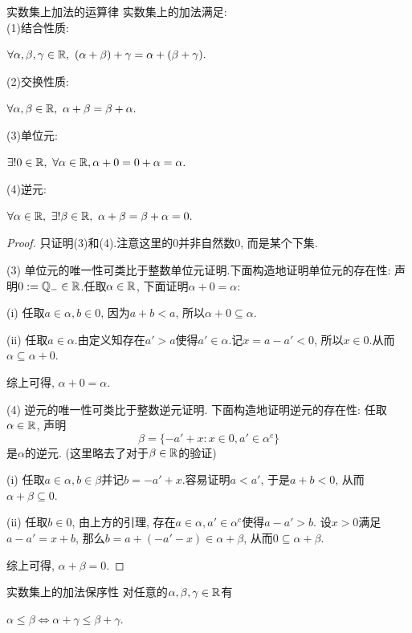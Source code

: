 \begin{proposition}{实数集上加法的运算律}
	实数集上的加法满足:  \\
	(1)结合性质: 
	\begin{center}
		$\forall \alpha , \beta , \gamma \in \mathbb{R} , ~(\alpha + \beta ) + \gamma = \alpha + (\beta + \gamma).$
	\end{center}
	(2)交换性质: 
	\begin{center}
		$\forall \alpha , \beta \in \mathbb{R}, ~\alpha + \beta = \beta + \alpha .$
	\end{center}
	(3)单位元: 
	\begin{center}
		$\exists ! 0 \in \mathbb{R} , ~\forall \alpha \in \mathbb{R} ,  \alpha + 0 = 0 + \alpha = \alpha .$
	\end{center}
	(4)逆元: 
	\begin{center}
		$\forall \alpha \in \mathbb{R} , ~\exists ! \beta \in \mathbb{R} , ~\alpha + \beta = \beta + \alpha = 0.$
	\end{center}
\end{proposition}
\begin{proof}
	只证明(3)和(4).注意这里的$0$并非自然数$0$, 而是某个下集. 
	
	(3) 单位元的唯一性可类比于整数单位元证明.下面构造地证明单位元的存在性: 声明$0 : = \mathbb{Q}_{-} \in \mathbb{R}$.任取$\alpha \in \mathbb{R}$, 下面证明$\alpha + 0 = \alpha$:  
	
	(i) 任取$a \in \alpha , b \in 0$, 因为$a + b < a$, 所以$\alpha + 0 \subseteq \alpha$. 
	
	(ii) 任取$a \in \alpha$.由定义知存在$a'>a$使得$a' \in \alpha$.记$x=a-a'<0$, 所以$x \in 0$.从而$\alpha \subseteq \alpha + 0$. 
	
	综上可得, $\alpha +0 = \alpha$. 
	
	(4) 逆元的唯一性可类比于整数逆元证明. 下面构造地证明逆元的存在性: 任取$\alpha \in \mathbb{R}$, 声明$$\beta = \{ -a'+x: x \in 0, a' \in \alpha ^c \}$$是$\alpha$的逆元. (这里略去了对于$\beta \in \mathbb{R}$的验证)
	
	(i) 任取$a \in \alpha , b \in \beta$并记$b=-a'+x$.容易证明$a<a'$, 于是$a+b <0$, 从而$\alpha + \beta \subseteq 0$. 
	
	(ii) 任取$b \in 0$, 由上方的引理, 存在$a \in \alpha , a' \in \alpha ^c$使得$a - a'>b$. 设$x>0$满足$a-a'=x+b$, 那么$b=a+(-a'-x) \in \alpha + \beta$, 从而$0 \subseteq \alpha + \beta$. 
	
	综上可得, $\alpha + \beta = 0$.
\end{proof}

\begin{proposition}{实数集上的加法保序性}
	对任意的$\alpha , \beta , \gamma \in \mathbb{R}$有
	\begin{center}
		$\alpha \leq \beta \Leftrightarrow \alpha + \gamma \leq \beta + \gamma .$
	\end{center}
\end{proposition}

